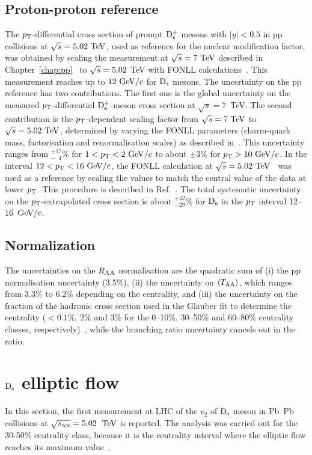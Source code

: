 \subsection{Proton-proton reference}
\label{sec:PPrefSyst}
The $p_{\rm T}$-differential cross section of prompt ${\rm D_s^+}$ mesons with 
$|y|<0.5$ in pp collisions at $\sqrt s=5.02~\mathrm{TeV}$, used as reference 
for the nuclear modification factor, was obtained by scaling the 
measurement at $\sqrt{s}=7~\mathrm{TeV}$ described in 
Chapter~\ref{chap:pp}~\cite{Acharya:2017jgo} to $\sqrt{s} = 5.02$ TeV 
with FONLL calculations~\cite{Cacciari:2012ny}. This measurement 
reaches up to $12~\mathrm{GeV}/c$ for ${\rm D_s}$ mesons.
The uncertainty on the pp reference 
has two contributions. The first one is the global uncertainty on the measured 
$p_{\rm T}$-differential ${\rm D_s^+}$-meson cross section at $\sqrt s=7$~TeV.
The second contribution is the $p_{\rm T}$-dependent scaling factor 
from $\sqrt{s}=7~\mathrm{TeV}$ to $\sqrt{s}=5.02~\mathrm{TeV}$, determined by varying
the FONLL parameters (charm-quark mass, factorisation and renormalisation scales) 
as described in~\cite{Averbeck:2011ga}. This uncertainty ranges from 
$^{+17}_{-\phantom{1}4}\%$ for $1<p_{\rm T}<2~\mathrm{GeV}/c$ to about $\pm3\%$ for $p_{\rm T}>10~\mathrm{GeV}/c$.
In the interval $12<p_{\rm T}<16~\mathrm{GeV}/c$, the FONLL calculation at 
$\sqrt s=5.02~\mathrm{TeV}$~\cite{Cacciari:2012ny} was used as a reference 
by scaling the values to match the central value of the data at lower $p_{\rm T}$. 
This procedure is described in Ref.~\cite{Adam:2015sza}. The total 
systematic uncertainty on the $p_{\rm T}$-extrapolated cross section is about 
$^{+42}_{-29}\%$ for ${\rm D_s}$ in the $p_{\rm T}$ interval 12--16~$\mathrm{GeV}/c$.


\subsection{Normalization}
\label{sec:NormalizSyst}
The uncertainties on the $R_{\rm AA}$ normalisation are the quadratic sum of 
(i) the pp normalisation uncertainty (3.5\%), 
(ii) the uncertainty on $\langle T_{\rm AA} \rangle$, which ranges from 3.3\% to 6.2\% depending on the centrality, and
(iii) the uncertainty on the fraction of the hadronic cross section used in the 
Glauber fit to determine the centrality ($<0.1\%$, $2\%$ and $3\%$ for the 0--10\%, 30--50\% 
and 60--80\% centrality classes, respectively)~\cite{Adam:2015sza}, while the branching ratio uncertainty cancels out in the 
ratio.

\section{${\rm D_s}$ elliptic flow}
In this section, the first measurement at LHC of the $v_2$ of 
${\rm D_s}$ meson in Pb--Pb collisions at 
$\sqrt{s_{\rm \scriptscriptstyle NN}} = 5.02$~$\mathrm{TeV}$ is reported. The analysis was carried 
out for the 30-50\% centrality class, because it is the centrality
interval where the elliptic flow reaches its maximum value~\cite{Adam:2016izf}. 

